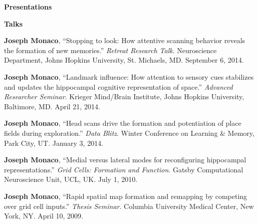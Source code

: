 \documentclass[10pt]{article}
\begin{document}
{\large \textbf{Presentations}}

\begin{description}
\item \textbf{Talks}
\item[\quad] \textbf{Joseph Monaco}, ``Stopping to look: How attentive scanning behavior reveals the formation of new memories.'' \emph{Retreat Research Talk}. Neuroscience Department, Johns Hopkins University, St. Michaels, MD. September 6, 2014.
\item[\quad] \textbf{Joseph Monaco}, ``Landmark influence: How attention to sensory cues stabilizes and updates the hippocampal cognitive representation of space.'' \emph{Advanced Researcher Seminar}. Krieger Mind/Brain Institute, Johns Hopkins University, Baltimore, MD. April 21, 2014.
\item[\quad] \textbf{Joseph Monaco}, ``Head scans drive the formation and potentiation of place fields during exploration.'' \emph{Data Blitz}. Winter Conference on Learning \& Memory, Park City, UT. January 3, 2014.
\item[\quad] \textbf{Joseph Monaco}, ``Medial versus lateral modes for reconfiguring hippocampal representations.'' \emph{Grid Cells: Formation and Function}. Gatsby Computational Neuroscience Unit, UCL, UK. July 1, 2010.
\item[\quad] \textbf{Joseph Monaco}, ``Rapid spatial map formation and remapping by competing over grid cell inputs.'' \emph{Thesis Seminar}. Columbia University Medical Center, New York, NY. April 10, 2009.
\end{description}
\end{document}
